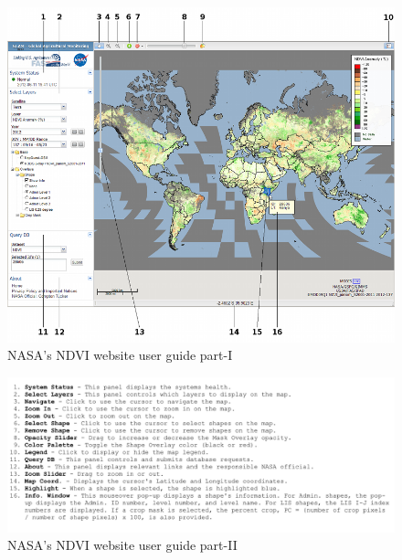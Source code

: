     \begin{figure}[H]
            \centering
            \includegraphics[width=1.0\linewidth]{figures/ch3/nasa_website_1.png}
            \caption{\label{fig:nasa_website_1} NASA's NDVI website user guide part-I \cite{GAM}}
    \end{figure}
    
    \begin{figure}[H]
            \centering
            \includegraphics[width=1.0\linewidth]{figures/ch3/nasa_website_2.png}
            \caption{\label{fig:nasa_website_2} NASA's NDVI website user guide part-II \cite{GAM}}
    \end{figure}    

